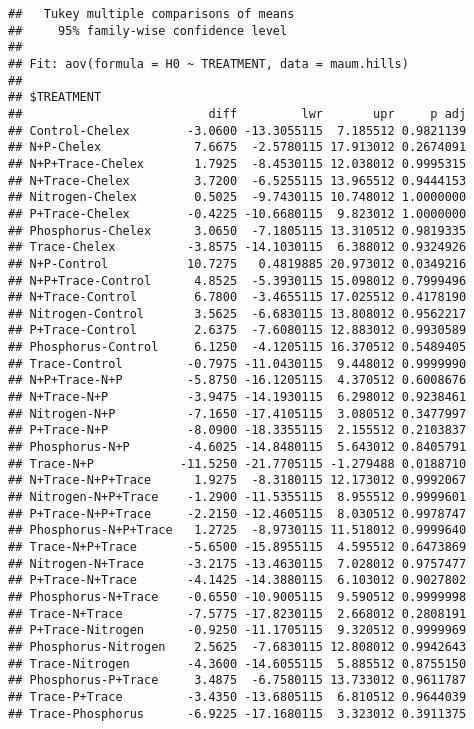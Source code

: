 \documentclass[]{article}
\begin{document}
\begin{verbatim}
##   Tukey multiple comparisons of means
##     95% family-wise confidence level
## 
## Fit: aov(formula = H0 ~ TREATMENT, data = maum.hills)
## 
## $TREATMENT
##                          diff         lwr       upr     p adj
## Control-Chelex        -3.0600 -13.3055115  7.185512 0.9821139
## N+P-Chelex             7.6675  -2.5780115 17.913012 0.2674091
## N+P+Trace-Chelex       1.7925  -8.4530115 12.038012 0.9995315
## N+Trace-Chelex         3.7200  -6.5255115 13.965512 0.9444153
## Nitrogen-Chelex        0.5025  -9.7430115 10.748012 1.0000000
## P+Trace-Chelex        -0.4225 -10.6680115  9.823012 1.0000000
## Phosphorus-Chelex      3.0650  -7.1805115 13.310512 0.9819335
## Trace-Chelex          -3.8575 -14.1030115  6.388012 0.9324926
## N+P-Control           10.7275   0.4819885 20.973012 0.0349216
## N+P+Trace-Control      4.8525  -5.3930115 15.098012 0.7999496
## N+Trace-Control        6.7800  -3.4655115 17.025512 0.4178190
## Nitrogen-Control       3.5625  -6.6830115 13.808012 0.9562217
## P+Trace-Control        2.6375  -7.6080115 12.883012 0.9930589
## Phosphorus-Control     6.1250  -4.1205115 16.370512 0.5489405
## Trace-Control         -0.7975 -11.0430115  9.448012 0.9999990
## N+P+Trace-N+P         -5.8750 -16.1205115  4.370512 0.6008676
## N+Trace-N+P           -3.9475 -14.1930115  6.298012 0.9238461
## Nitrogen-N+P          -7.1650 -17.4105115  3.080512 0.3477997
## P+Trace-N+P           -8.0900 -18.3355115  2.155512 0.2103837
## Phosphorus-N+P        -4.6025 -14.8480115  5.643012 0.8405791
## Trace-N+P            -11.5250 -21.7705115 -1.279488 0.0188710
## N+Trace-N+P+Trace      1.9275  -8.3180115 12.173012 0.9992067
## Nitrogen-N+P+Trace    -1.2900 -11.5355115  8.955512 0.9999601
## P+Trace-N+P+Trace     -2.2150 -12.4605115  8.030512 0.9978747
## Phosphorus-N+P+Trace   1.2725  -8.9730115 11.518012 0.9999640
## Trace-N+P+Trace       -5.6500 -15.8955115  4.595512 0.6473869
## Nitrogen-N+Trace      -3.2175 -13.4630115  7.028012 0.9757477
## P+Trace-N+Trace       -4.1425 -14.3880115  6.103012 0.9027802
## Phosphorus-N+Trace    -0.6550 -10.9005115  9.590512 0.9999998
## Trace-N+Trace         -7.5775 -17.8230115  2.668012 0.2808191
## P+Trace-Nitrogen      -0.9250 -11.1705115  9.320512 0.9999969
## Phosphorus-Nitrogen    2.5625  -7.6830115 12.808012 0.9942643
## Trace-Nitrogen        -4.3600 -14.6055115  5.885512 0.8755150
## Phosphorus-P+Trace     3.4875  -6.7580115 13.733012 0.9611787
## Trace-P+Trace         -3.4350 -13.6805115  6.810512 0.9644039
## Trace-Phosphorus      -6.9225 -17.1680115  3.323012 0.3911375
\end{verbatim}
\end{document}
